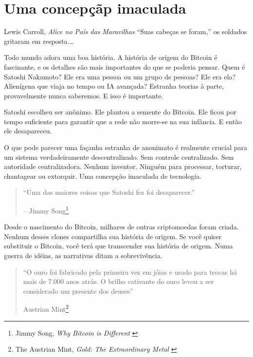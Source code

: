 \chapter{Uma concepçãp imaculada}
\label{les:5}

\begin{chapquote}{Lewis Carroll, \textit{Alice no País das Maravilhas}}
\enquote{Suas cabeças se foram,} os soldados gritaram em resposta.\ldots
\end{chapquote}

Todo mundo adora uma boa história. A história de origem do Bitcoin é 
fascinante, e os detalhes são mais importantes do que se poderia
pensar. Quem é Satoshi Nakamoto? Ele era uma pessoa ou um grupo de
pessoas? Ele era ela? Alienígena que viaja no tempo ou IA avançada? Estranha
teorias à parte, provavelmente nunca saberemos. E isso é importante.

Satoshi escolheu ser anônimo. Ele plantou a semente do Bitcoin. Ele ficou 
por tempo suficiente para garantir que a rede não morre-se na sua
infância. E então ele desapareceu.

O que pode parecer uma façanha estranha de anonimato é realmente crucial para um
sistema verdadeiramente descentralizado. Sem controle centralizado. Sem 
autoridade centralizadora. Nenhum inventor. Ninguém para processar, torturar, chantagear ou
extorquir. Uma concepção imaculada de tecnologia.

\begin{quotation}\begin{samepage}
\enquote{Uma das maiores coisas que Satoshi fez foi desaparecer.}
\begin{flushright} -- Jimmy Song\footnote{Jimmy Song, \textit{Why Bitcoin is Different} \cite{bitcoin-different}}
\end{flushright}\end{samepage}\end{quotation}

\newpage

Desde o nascimento do Bitcoin, milhares de outras criptomoedas foram
criada. Nenhum desses clones compartilha sua história de origem. Se você quiser
substituir o Bitcoin, você terá que transcender sua história de origem. Numa guerra
de idéias, as narrativas ditam a sobrevivência.

\begin{quotation}\begin{samepage}
\enquote{O ouro foi fabricado pela primeira vez em jóias e usado para trocas há mais de 7.000
anos atrás. O brilho cativante do ouro levou a ser considerado um presente
dos deuses}
\begin{flushright} Austrian Mint\footnote{The Austrian Mint, \textit{Gold: The Extraordinary Metal} \cite{gold-gift-gods}}
\end{flushright}\end{samepage}\end{quotation}

